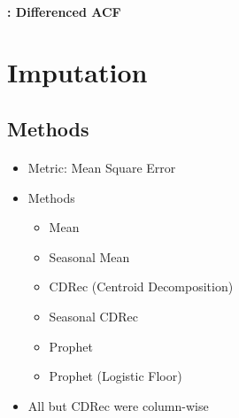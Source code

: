 \begin{frame}{\insertsectionhead}
	\framesubtitle{\insertsubsectionhead: Differenced ACF}
\end{frame}

\section{Imputation}

\subsection{Methods}
\begin{frame}{\insertsectionhead}
	\framesubtitle{\insertsubsectionhead}
	\begin{itemize}
		\item<+-> Metric: Mean Square Error
		\item<+-> Methods
		\begin{itemize}
			\item<+-> Mean
			\item<+-> Seasonal Mean
			\item<+-> CDRec (Centroid Decomposition)
			\item<+-> Seasonal CDRec
			\item<+-> Prophet
			\item<+-> Prophet (Logistic Floor)
		\end{itemize}
		\item<+-> All but CDRec were column-wise
	\end{itemize}
\end{frame}

